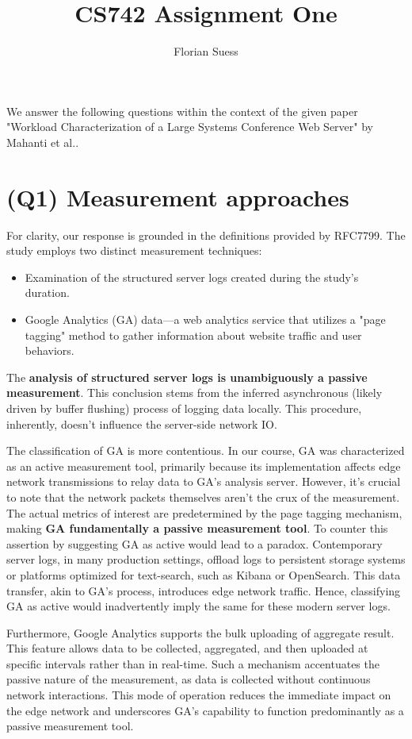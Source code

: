 \documentclass{article}
\date{\displaydate{date}}
\title{CS742 Assignment One}
\author{Florian Suess}
\begin{document}
\maketitle
We answer the following questions within the context of the given paper "Workload Characterization of a Large Systems Conference Web Server" by Mahanti et al.\cite{mahanti2009}.
\section*{(Q1) Measurement approaches}
For clarity, our response is grounded in the definitions provided by RFC7799\cite{rfc7799}. The study employs two distinct measurement techniques:

\begin{itemize}
\item Examination of the structured server logs created during the study's duration.
\item Google Analytics (GA) data—a web analytics service that utilizes a "page tagging" method to gather information about website traffic and user behaviors.
\end{itemize}

The \textbf{analysis of structured server logs is unambiguously a passive measurement}. This conclusion stems from the inferred asynchronous (likely driven by buffer flushing) process of logging data locally. This procedure, inherently, doesn't influence the server-side network IO.

The classification of GA is more contentious. In our course, GA was characterized as an active measurement tool, primarily because its implementation affects edge network transmissions to relay data to GA's analysis server. However, it's crucial to note that the network packets themselves aren't the crux of the measurement. The actual metrics of interest are predetermined by the page tagging mechanism, making \textbf{GA fundamentally a passive measurement tool}. To counter this assertion by suggesting GA as active would lead to a paradox. Contemporary server logs, in many production settings, offload logs to persistent storage systems or platforms optimized for text-search, such as Kibana or OpenSearch. This data transfer, akin to GA's process, introduces edge network traffic. Hence, classifying GA as active would inadvertently imply the same for these modern server logs.

Furthermore, Google Analytics supports the bulk uploading of aggregate result\cite{googleanalyticsbatching}. This feature allows data to be collected, aggregated, and then uploaded at specific intervals rather than in real-time. Such a mechanism accentuates the passive nature of the measurement, as data is collected without continuous network interactions. This mode of operation reduces the immediate impact on the edge network and underscores GA's capability to function predominantly as a passive measurement tool.
\end{document}
